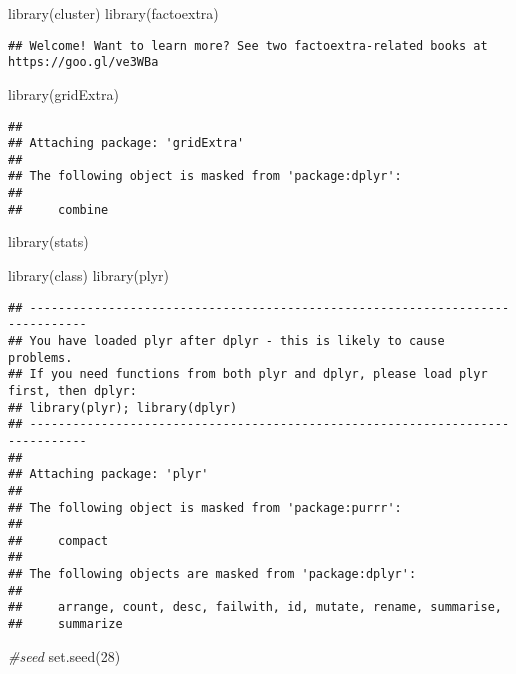 \documentclass[
]{article}
\newenvironment{Shaded}{\begin{snugshade}}{\end{snugshade}}
\newcommand{\CommentTok}[1]{\textcolor[rgb]{0.56,0.35,0.01}{\textit{#1}}}
\newcommand{\DecValTok}[1]{\textcolor[rgb]{0.00,0.00,0.81}{#1}}
\newcommand{\FunctionTok}[1]{\textcolor[rgb]{0.00,0.00,0.00}{#1}}
\newcommand{\NormalTok}[1]{#1}
\begin{document}
\begin{Shaded}
\begin{Highlighting}[]
\FunctionTok{library}\NormalTok{(cluster)}
\FunctionTok{library}\NormalTok{(factoextra)}
\end{Highlighting}
\end{Shaded}

\begin{verbatim}
## Welcome! Want to learn more? See two factoextra-related books at https://goo.gl/ve3WBa
\end{verbatim}

\begin{Shaded}
\begin{Highlighting}[]
\FunctionTok{library}\NormalTok{(gridExtra)}
\end{Highlighting}
\end{Shaded}

\begin{verbatim}
## 
## Attaching package: 'gridExtra'
## 
## The following object is masked from 'package:dplyr':
## 
##     combine
\end{verbatim}

\begin{Shaded}
\begin{Highlighting}[]
\FunctionTok{library}\NormalTok{(stats)}

\FunctionTok{library}\NormalTok{(class)}
\FunctionTok{library}\NormalTok{(plyr)}
\end{Highlighting}
\end{Shaded}

\begin{verbatim}
## ------------------------------------------------------------------------------
## You have loaded plyr after dplyr - this is likely to cause problems.
## If you need functions from both plyr and dplyr, please load plyr first, then dplyr:
## library(plyr); library(dplyr)
## ------------------------------------------------------------------------------
## 
## Attaching package: 'plyr'
## 
## The following object is masked from 'package:purrr':
## 
##     compact
## 
## The following objects are masked from 'package:dplyr':
## 
##     arrange, count, desc, failwith, id, mutate, rename, summarise,
##     summarize
\end{verbatim}

\begin{Shaded}
\begin{Highlighting}[]
\CommentTok{\#seed}
\FunctionTok{set.seed}\NormalTok{(}\DecValTok{28}\NormalTok{)}
\end{Highlighting}
\end{Shaded}
\end{document}
